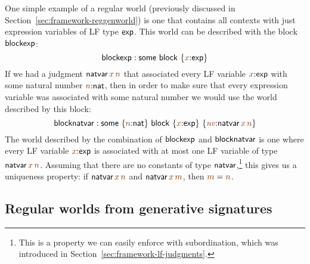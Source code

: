 One simple example of a regular world (previously discussed in
Section~\ref{sec:framework-reggenworld}) is one that contains 
all contexts with just expression variables of LF type ${\sf exp}$. This
world can be described with the block ${\sf blockexp}$:
\[
 {\sf blockexp} : 
 {\sf some}
~{\sf block}~\{{\lf x}{:}{\sf exp}\}
\]
If we had a judgment ${\sf natvar}\,\lf{x}\,\lf{n}$ that associated
every LF variable $\lf{x}{:}{\sf exp}$ with some natural number
$\lf{n}{:}{\sf nat}$, then in order to make sure that every expression
variable was associated with some natural number we would use the world
described by this block:
\[
 {\sf blocknatvar} : 
 {\sf some}~\{{\lf n}{:}{\sf nat}\}
~{\sf block}~\{{\lf x}{:}{\sf exp}\}~
               \{\lf{\it nv}{:}{\sf natvar}\,\lf{x}\,\lf{n}\}
\]
The world described by the combination of ${\sf blockexp}$ and ${\sf
  blocknatvar}$ is one where every LF variable $\lf{x}{:}{\sf exp}$ is
associated with at most one LF variable of type ${\sf
  natvar}\,\lf{x}\,\lf{n}$. Assuming that there are no constants of
type ${\sf natvar}$,\footnote{This is a property we can easily enforce
  with subordination, which was introduced in
  Section~\ref{sec:framework-lf-judgments}.} this gives us a
uniqueness property: if ${\sf natvar}\,\lf{x}\,\lf{n}$ and ${\sf
  natvar}\,\lf{x}\,\lf{m}$, then $\lf{m} = \lf{n}$.

\subsection{Regular worlds from generative signatures}

